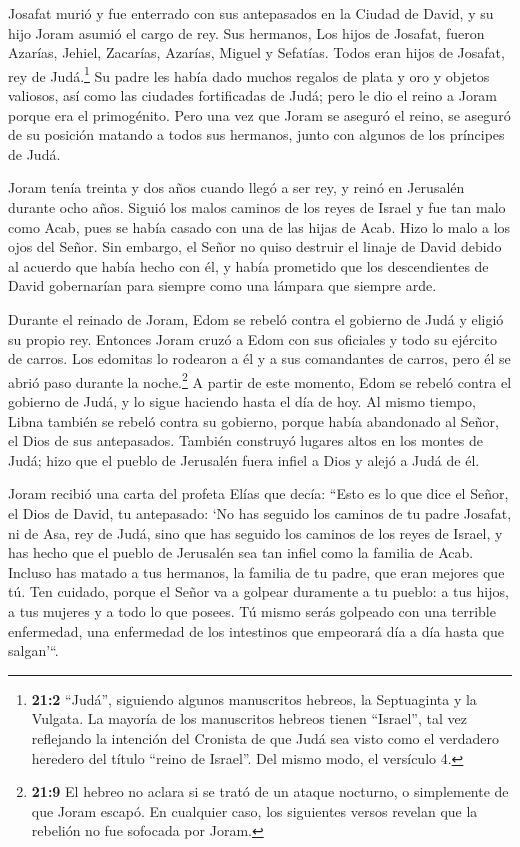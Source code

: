  Josafat murió y fue enterrado con sus antepasados en la
Ciudad de David, y su hijo Joram asumió el cargo de rey. 
Sus hermanos, Los hijos de Josafat, fueron Azarías, Jehiel, Zacarías,
Azarías, Miguel y Sefatías. Todos eran hijos de Josafat, rey de
Judá.\footnote{\textbf{21:2} ``Judá'', siguiendo algunos manuscritos
  hebreos, la Septuaginta y la Vulgata. La mayoría de los manuscritos
  hebreos tienen ``Israel'', tal vez reflejando la intención del
  Cronista de que Judá sea visto como el verdadero heredero del título
  ``reino de Israel''. Del mismo modo, el versículo 4.}  Su
padre les había dado muchos regalos de plata y oro y objetos valiosos,
así como las ciudades fortificadas de Judá; pero le dio el reino a Joram
porque era el primogénito.  Pero una vez que Joram se
aseguró el reino, se aseguró de su posición matando a todos sus
hermanos, junto con algunos de los príncipes de Judá.

 Joram tenía treinta y dos años cuando llegó a ser rey, y
reinó en Jerusalén durante ocho años.  Siguió los malos
caminos de los reyes de Israel y fue tan malo como Acab, pues se había
casado con una de las hijas de Acab. Hizo lo malo a los ojos del Señor.
 Sin embargo, el Señor no quiso destruir el linaje de David
debido al acuerdo que había hecho con él, y había prometido que los
descendientes de David gobernarían para siempre como una lámpara que
siempre arde.

 Durante el reinado de Joram, Edom se rebeló contra el
gobierno de Judá y eligió su propio rey.  Entonces Joram
cruzó a Edom con sus oficiales y todo su ejército de carros. Los
edomitas lo rodearon a él y a sus comandantes de carros, pero él se
abrió paso durante la noche.\footnote{\textbf{21:9} El hebreo no aclara
  si se trató de un ataque nocturno, o simplemente de que Joram escapó.
  En cualquier caso, los siguientes versos revelan que la rebelión no
  fue sofocada por Joram.}  A partir de este momento, Edom
se rebeló contra el gobierno de Judá, y lo sigue haciendo hasta el día
de hoy. Al mismo tiempo, Libna también se rebeló contra su gobierno,
porque había abandonado al Señor, el Dios de sus antepasados.
 También construyó lugares altos en los montes de Judá;
hizo que el pueblo de Jerusalén fuera infiel a Dios y alejó a Judá de
él.

 Joram recibió una carta del profeta Elías que decía:
``Esto es lo que dice el Señor, el Dios de David, tu antepasado: `No has
seguido los caminos de tu padre Josafat, ni de Asa, rey de Judá,
 sino que has seguido los caminos de los reyes de Israel, y
has hecho que el pueblo de Jerusalén sea tan infiel como la familia de
Acab. Incluso has matado a tus hermanos, la familia de tu padre, que
eran mejores que tú.  Ten cuidado, porque el Señor va a
golpear duramente a tu pueblo: a tus hijos, a tus mujeres y a todo lo
que posees.  Tú mismo serás golpeado con una terrible
enfermedad, una enfermedad de los intestinos que empeorará día a día
hasta que salgan'``.

